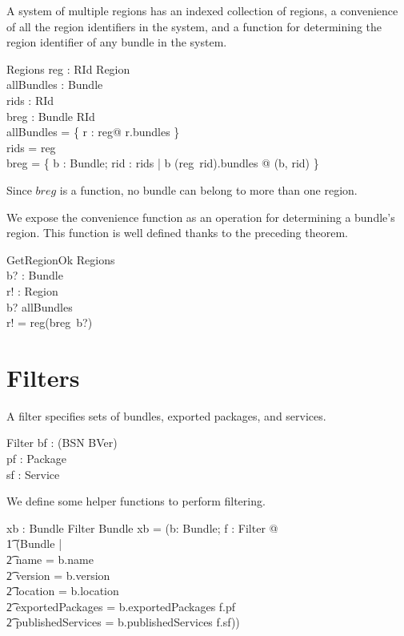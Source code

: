 \documentclass[a4paper,9pt]{article}
\begin{document}
A system of multiple regions has an indexed collection of regions, a convenience of all the
region identifiers in the system, and a function for
determining the region identifier of any bundle in the system.
\begin{schema}{Regions}
  reg : RId \pfun Region \\
  allBundles : \power Bundle \\
  rids : \power RId \\
  breg : Bundle \pfun RId \\
\where
 allBundles = \bigcup \{ r : \ran reg@ r.bundles \} \\
 rids = \dom reg \\
 breg = \{ b : Bundle; rid : rids | b \in (reg~rid).bundles @ (b, rid) \} \\
\end{schema}
Since $breg$ is a function, no bundle can belong to more than one region.

We expose the convenience function as an operation for determining a bundle's region.
This function is well defined thanks to the preceding theorem.
\begin{schema}{GetRegionOk}
  \Xi Regions \\
  b? : Bundle \\
  r! : Region \\
\where
  b? \in allBundles \\
  r! = reg(breg~b?) \\
\end{schema}

\clearpage
\section{Filters}
\label{cha:filters}

A filter specifies sets of bundles, exported packages, and services.
\begin{schema}{Filter}
  bf : \power (BSN \cross BVer) \\
  pf : \power Package \\
  sf : \power Service \\
\end{schema}

We define some helper functions to perform filtering.
\begin{axdef}
  xb : Bundle \cross Filter \fun Bundle
\where
  xb = (\lambda b: Bundle; f : Filter @ \\
\t1  (\mu Bundle | \\
\t2 name = b.name \land \\
\t2 version = b.version \land \\
\t2 location = b.location \land \\
\t2 exportedPackages = b.exportedPackages \cap f.pf \land \\
\t2 publishedServices = b.publishedServices \cap f.sf))
\end{axdef}
\end{document}
